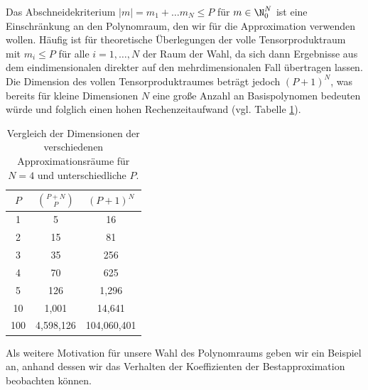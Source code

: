 \begin{mathbem}
Das Abschneidekriterium $|m|=m_1+\dots m_N\le P$ für $m\in\N_0^N$ ist eine Einschränkung an den Polynomraum, den wir für die Approximation verwenden wollen. Häufig ist für theoretische Überlegungen der volle Tensorproduktraum mit $m_i\le P$ für alle $i=1,\dots,N$ der Raum der Wahl, da sich dann Ergebnisse aus dem eindimensionalen direkter auf den mehrdimensionalen Fall übertragen lassen. Die Dimension des vollen Tensorproduktraumes beträgt jedoch $(P+1)^N$, was bereits für kleine Dimensionen $N$ eine große Anzahl an Basispolynomen bedeuten würde und folglich einen hohen Rechenzeitaufwand (vgl. Tabelle \ref{table:poly_space_dim}).
\begin{table}
\centering
\begin{tabular}{c|cc}
$P$ & $\binom{P+N}{P}$ & $(P+1)^N$\\
\hline
1  &  5  &  16 \\
2  &  15  &  81 \\
3  &  35  &  256 \\
4  &  70  &  625 \\
5  &  126  &  1,296 \\
10  &  1,001  &  14,641 \\
100  &  4,598,126  &  104,060,401 
\end{tabular}
\caption{Vergleich der Dimensionen der verschiedenen Approximationsräume für $N=4$ und unterschiedliche $P$.}
\label{table:poly_space_dim}
\end{table}
\end{mathbem}
Als weitere Motivation für unsere Wahl des Polynomraums geben wir ein Beispiel an, anhand dessen wir das Verhalten der Koeffizienten der Bestapproximation beobachten können.
